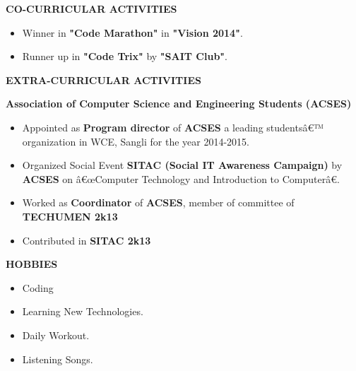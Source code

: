 \documentclass{article}
\begin{document}
\begin{framed}
	\large{\textbf{CO-CURRICULAR ACTIVITIES}}
\end{framed}
\begin{itemize}
	\item Winner in \textbf{"Code Marathon"} in \textbf{"Vision 2014"}.
	\item Runner up in \textbf{"Code Trix"}  by \textbf{ "SAIT Club"}.
\end{itemize}





\begin{framed}
	\large{\textbf{EXTRA-CURRICULAR ACTIVITIES}}
\end{framed}

\textbf{Association of Computer Science and Engineering Students (ACSES)}
\begin{itemize}	
	\item Appointed as \textbf{Program director} of \textbf{ACSES} a leading studentsâ€™ organization in WCE, Sangli for the year 2014-2015.
	\item Organized Social Event \textbf{SITAC (Social IT Awareness Campaign)} by \textbf{ACSES} on â€œComputer Technology and Introduction to Computerâ€.
	\item Worked as \textbf{Coordinator} of \textbf{ACSES}, member of committee of \textbf{TECHUMEN 2k13}
	\item Contributed in \textbf{SITAC 2k13}
	
\end{itemize}

\newpage


\begin{framed}
	\large{\textbf{HOBBIES}}
\end{framed}
\begin{itemize}
	\item Coding
	\item Learning New Technologies.
	\item Daily Workout.
	\item Listening Songs. 
\end{itemize}
\end{document}
